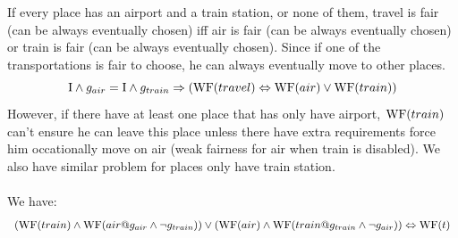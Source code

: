 If every place has an airport and a train station, or none of them, travel is fair (can be always eventually chosen) iff air is fair (can be always eventually chosen) or train is fair (can be always eventually chosen). Since if one of the transportations is fair to choose, he can always eventually move to other places.
\begin{displaymath}
  \mathrm{I}\wedge{g_{air}} = \mathrm{I}\wedge{g_{train}}\Rightarrow(\mathrm{WF}(travel)\Leftrightarrow\mathrm{WF}(air)\lor\mathrm{WF}(train))
\end{displaymath}
However, if there have at least one place that has only have airport, $\mathrm{WF}(train)$ can't ensure he can leave this place unless there have extra requirements force him occationally move on air (weak fairness for air when train is disabled). We also have similar problem for places only have train station. \\
\\
We have:
\begin{displaymath}
  (\mathrm{WF}(train)\wedge\mathrm{WF}(air@g_{air}\wedge\neg{g}_{train}))\vee(\mathrm{WF}(air)\wedge\mathrm{WF}(train@g_{train}\wedge\neg{g}_{air})) \Leftrightarrow\mathrm{WF}(t)
\end{displaymath}

